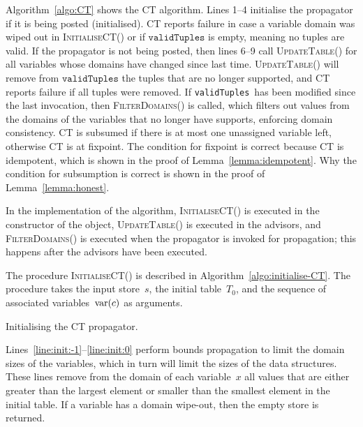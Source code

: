 \documentclass[a4paper,11pt]{article}
\theoremstyle{definition}
\newcommand{\Algoref}[1]{Algorithm~\ref{#1}}
\newcommand{\Linesref}[2]{Lines~\ref{#1}--\ref{#2}}
\newcommand{\CurrTable}{\texttt{validTuples}}
\def\UpdateTable{\textsc{Update\-Table}}
\def\FilterDomains{\textsc{Filter\-Domains}}
\def\InitialiseCT{\textsc{Initialise\-CT}}
\numberwithin{equation}{section}
\begin{document}
\Algoref{algo:CT} shows the CT algorithm. Lines 1--4 initialise the propagator
if it is being posted (initialised). CT reports failure in case a variable domain was
wiped out in \InitialiseCT() or if $\CurrTable$ is empty, meaning no tuples are valid.
If the propagator is not being posted, then
lines 6--9 call \UpdateTable() for all variables whose domains have changed
since last time. \UpdateTable() will remove from $\CurrTable$ the tuples that
are no longer supported, and CT reports failure if all tuples were removed.
If \CurrTable~has been modified since the last invocation, then \FilterDomains() is
called, which filters out values from the domains of the variables that
no longer have supports, enforcing domain consistency.
CT is subsumed if there is at most one unassigned variable
left, otherwise CT is at fixpoint.
The condition for fixpoint is correct because CT is idempotent,
which is shown in the proof of Lemma~\ref{lemma:idempotent}.
Why the condition for subsumption is correct is shown in the proof of
Lemma~\ref{lemma:honest}.

In the implementation of the algorithm,
\InitialiseCT() is executed in the constructor of the
object, \UpdateTable() is executed in the advisors, and \FilterDomains() is
executed when the propagator is invoked for propagation; this happens after
the advisors have been executed.



\bigskip

The procedure \InitialiseCT() is described in
\Algoref{algo:initialise-CT}. The procedure takes the
input store~$s$, the
initial table~$T_0$, and the sequence of associated
variables~$\text{var}(c)$ as arguments.

\begin{algorithm}[t]
  \begin{algorithmic}[1]  %
    
  \end{algorithmic}
  \caption{Initialising the CT propagator.}
  \label{algo:initialise-CT}
\end{algorithm}

\Linesref{line:init:-1}{line:init:0} perform bounds
  propagation to limit the domain sizes of the variables,
  which in turn will limit the sizes of the data structures.
  These lines remove from the domain of each variable~$x$ all
  values that are either greater
  than the largest element or smaller than the smallest element in the
  initial table. If a variable has a domain wipe-out,
  then the empty store is returned.
\end{document}
